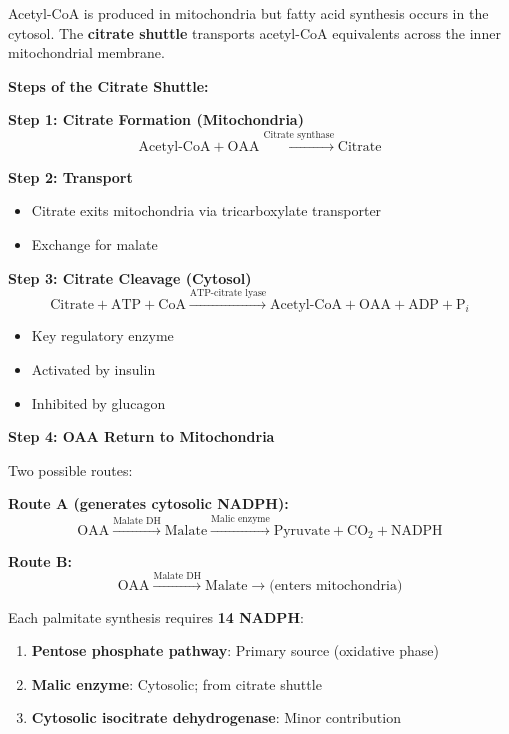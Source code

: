 Acetyl-CoA is produced in mitochondria but fatty acid synthesis occurs in the cytosol. The \textbf{citrate shuttle} transports acetyl-CoA equivalents across the inner mitochondrial membrane.

\textbf{Steps of the Citrate Shuttle:}

\textbf{Step 1: Citrate Formation (Mitochondria)}
\[
\text{Acetyl-CoA} + \text{OAA} \xrightarrow{\text{Citrate synthase}} \text{Citrate}
\]

\textbf{Step 2: Transport}
\begin{itemize}
    \item Citrate exits mitochondria via tricarboxylate transporter
    \item Exchange for malate
\end{itemize}

\textbf{Step 3: Citrate Cleavage (Cytosol)}
\[
\text{Citrate} + \text{ATP} + \text{CoA} \xrightarrow{\text{ATP-citrate lyase}} \text{Acetyl-CoA} + \text{OAA} + \text{ADP} + \text{P}_i
\]
\begin{itemize}
    \item Key regulatory enzyme
    \item Activated by insulin
    \item Inhibited by glucagon
\end{itemize}

\textbf{Step 4: OAA Return to Mitochondria}

Two possible routes:

\textbf{Route A (generates cytosolic NADPH):}
\[
\text{OAA} \xrightarrow{\text{Malate DH}} \text{Malate} \xrightarrow{\text{Malic enzyme}} \text{Pyruvate} + \text{CO}_2 + \text{NADPH}
\]

\textbf{Route B:}
\[
\text{OAA} \xrightarrow{\text{Malate DH}} \text{Malate} \rightarrow \text{(enters mitochondria)}
\]

\begin{tcolorbox}[colback=blue!5, colframe=blue!70!black, title=\textbf{NADPH Sources for Fatty Acid Synthesis}]
Each palmitate synthesis requires \textbf{14 NADPH}:
\begin{enumerate}
    \item \textbf{Pentose phosphate pathway}: Primary source (oxidative phase)
    \item \textbf{Malic enzyme}: Cytosolic; from citrate shuttle
    \item \textbf{Cytosolic isocitrate dehydrogenase}: Minor contribution
\end{enumerate}
\end{tcolorbox}

